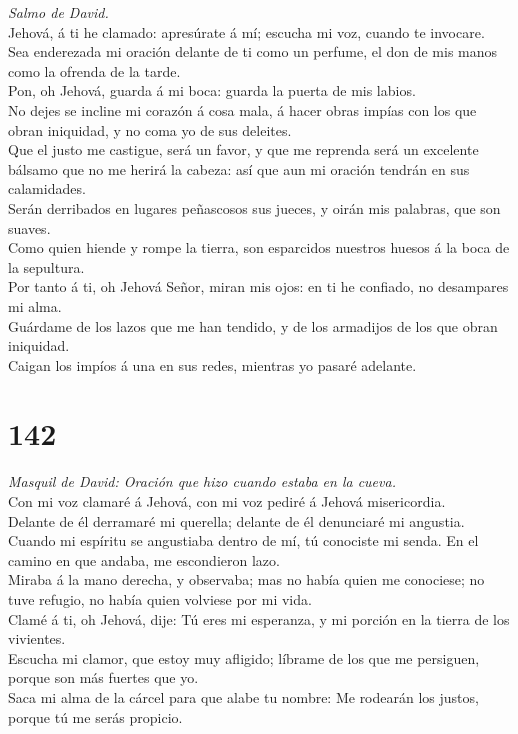  \emph{Salmo de David.}\\
Jehová, á ti he clamado: apresúrate á mí; escucha mi voz, cuando te
invocare.\\
 Sea enderezada mi oración delante de ti como un perfume, el
don de mis manos como la ofrenda de la tarde.\\
 Pon, oh Jehová, guarda á mi boca: guarda la puerta de mis
labios.\\
 No dejes se incline mi corazón á cosa mala, á hacer obras
impías con los que obran iniquidad, y no coma yo de sus deleites.\\
 Que el justo me castigue, será un favor, y que me reprenda
será un excelente bálsamo que no me herirá la cabeza: así que aun mi
oración tendrán en sus calamidades.\\
 Serán derribados en lugares peñascosos sus jueces, y oirán
mis palabras, que son suaves.\\
 Como quien hiende y rompe la tierra, son esparcidos
nuestros huesos á la boca de la sepultura.\\
 Por tanto á ti, oh Jehová Señor, miran mis ojos: en ti he
confiado, no desampares mi alma.\\
 Guárdame de los lazos que me han tendido, y de los
armadijos de los que obran iniquidad.\\
 Caigan los impíos á una en sus redes, mientras yo pasaré
adelante.

\hypertarget{section-141}{%
\section{142}\label{section-141}}

 \emph{Masquil de David: Oración que hizo cuando estaba en
la cueva.}\\
Con mi voz clamaré á Jehová, con mi voz pediré á Jehová misericordia.\\
 Delante de él derramaré mi querella; delante de él
denunciaré mi angustia.\\
 Cuando mi espíritu se angustiaba dentro de mí, tú conociste
mi senda. En el camino en que andaba, me escondieron lazo.\\
 Miraba á la mano derecha, y observaba; mas no había quien
me conociese; no tuve refugio, no había quien volviese por mi vida.\\
 Clamé á ti, oh Jehová, dije: Tú eres mi esperanza, y mi
porción en la tierra de los vivientes.\\
 Escucha mi clamor, que estoy muy afligido; líbrame de los
que me persiguen, porque son más fuertes que yo.\\
 Saca mi alma de la cárcel para que alabe tu nombre: Me
rodearán los justos, porque tú me serás propicio.

